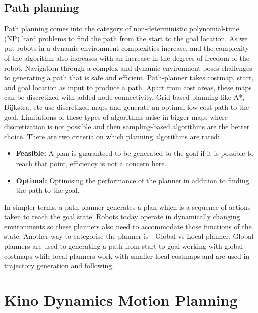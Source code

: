 \documentclass[9pt,a4paper,twoside]{rho-class/rho}
\begin{document}
    \subsection{Path planning}

        Path planning comes into the category of non-deterministic polynomial-time (NP) hard problems to find the path from the start to the goal location. As we put robots in a dynamic environment complexities increase, and the complexity of the algorithm also increases with an increase in the degrees of freedom of the robot. Navigation through a complex and dynamic environment poses challenges to generating a path that is safe and efficient. Path-planner takes costmap, start, and goal location as input to produce a path. Apart from cost areas, these maps can be discretized with added node connectivity. Grid-based planning like A*, Dijkstra, etc use discretized maps and generate an optimal low-cost path to the goal. Limitations of these types of algorithms arise in bigger maps where discretization is not possible and then sampling-based algorithms are the better choice. There are two criteria on which planning algorithms are rated: 
        
        \begin{itemize}
            \item \textbf{Feasible:} A plan is guaranteed to be generated to the goal if it is possible to reach that point, efficiency is not a concern here.
            
            \item \textbf{Optimal:} Optimising the performance of the planner in addition to finding the path to the goal.
        \end{itemize}
        
        In simpler terms, a path planner generates a plan which is a sequence of actions taken to reach the goal state. Robots today operate in dynamically changing environments so these planners also need to accommodate those functions of the state. Another way to categorise the planner is - Global vs Local planner. Global planners are used to generating a path from start to goal working with global costmaps while local planners work with smaller local costmaps and are used in trajectory generation and following. 



        
\section{Kino Dynamics Motion Planning}
\end{document}
